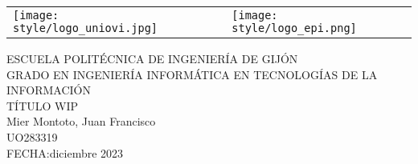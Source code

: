 \begin{titlepage}
    \centering
    \bfseries {
        \null
        \vspace{0cm}
        \begin{table}[h]
            \centering
            \begin{tabular}{m{10cm} m{1cm} m{3cm}}
                \vspace{0.2cm}
                \texttt{[image: style/logo\_uniovi.jpg]} &  & \vspace{1.52mm} \texttt{[image: style/logo\_epi.png]} \\
            \end{tabular}
        \end{table}

        \vspace{3\baselineskip}

        \Large{
            ESCUELA POLITÉCNICA DE INGENIERÍA DE GIJÓN \\ \vspace{3\baselineskip}
        }
        \large{
            GRADO EN INGENIERÍA INFORMÁTICA EN TECNOLOGÍAS DE LA INFORMACIÓN \\ \vspace{3\baselineskip}
            TÍTULO WIP \\
            \vspace{3\baselineskip}
            Mier Montoto, Juan Francisco \\
            UO283319 \\
            \vspace{2\baselineskip}
            FECHA:\@ diciembre 2023
        }
    }
\end{titlepage}
